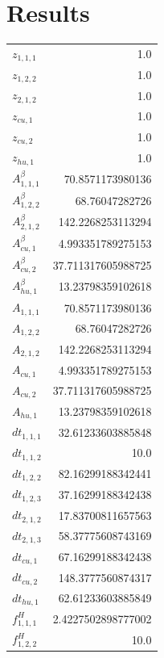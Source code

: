 \documentclass{article}%
\makeatletter
\let\mcnewpage=\newpage%
\newcommand{\TrickSupertabularIntoMulticols}{%
\renewcommand\newpage{%
\if@firstcolumn%
\hrule width\linewidth height0pt%
\columnbreak%
\else%
\mcnewpage%
\fi%
}%
}%
\makeatother
\begin{document}
\section{Results}%
\thispagestyle{plain}%
\begin{multicols*}{3}%
\TrickSupertabularIntoMulticols%
%
\begin{supertabular}{lr}%
	$z_{1,1,1}$ & 1.0 \\%
	$z_{1,2,2}$ & 1.0 \\%
	$z_{2,1,2}$ & 1.0 \\%
	$z_{cu,1}$ & 1.0 \\%
	$z_{cu,2}$ & 1.0 \\%
	$z_{hu,1}$ & 1.0 \\%
	$A_{1,1,1}^{\beta}$ & 70.8571173980136 \\%
	$A_{1,2,2}^{\beta}$ & 68.76047282726 \\%
	$A_{2,1,2}^{\beta}$ & 142.2268253113294 \\%
	$A_{cu,1}^{\beta}$ & 4.993351789275153 \\%
	$A_{cu,2}^{\beta}$ & 37.711317605988725 \\%
	$A_{hu,1}^{\beta}$ & 13.23798359102618 \\%
	$A_{1,1,1}$ & 70.8571173980136 \\%
	$A_{1,2,2}$ & 68.76047282726 \\%
	$A_{2,1,2}$ & 142.2268253113294 \\%
	$A_{cu,1}$ & 4.993351789275153 \\%
	$A_{cu,2}$ & 37.711317605988725 \\%
	$A_{hu,1}$ & 13.23798359102618 \\%
	$dt_{1,1,1}$ & 32.61233603885848 \\%
	$dt_{1,1,2}$ & 10.0 \\%
	$dt_{1,2,2}$ & 82.16299188342441 \\%
	$dt_{1,2,3}$ & 37.16299188342438 \\%
	$dt_{2,1,2}$ & 17.83700811657563 \\%
	$dt_{2,1,3}$ & 58.37775608743169 \\%
	$dt_{cu,1}$ & 67.16299188342438 \\%
	$dt_{cu,2}$ & 148.3777560874317 \\%
	$dt_{hu,1}$ & 62.61233603885849 \\%
	$f_{1,1,1}^{H}$ & 2.4227502898777002 \\%
	$f_{1,2,2}^{H}$ & 10.0 \\%

\end{supertabular}
\end{multicols*}
\end{document}
